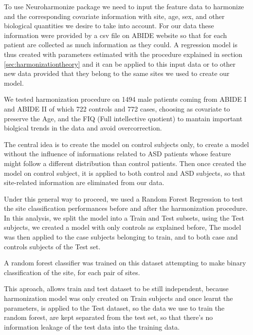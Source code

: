 \documentclass[10pt]{report}
\begin{document}
To use Neuroharmonize package we need to input the feature data to harmonize and the corresponding covariate information with site, age, sex, and other biological quantities we desire to take into account.
For our data these information were provided by a csv file on ABIDE website so that for each patient are collected as much information as they could.
A regression model is thus created with parameters estimated with the procedure explained in section \ref{sec:harmonizationtheory} and it can be applied to this input data or to other new data provided that they belong to the same sites we used to create our model.

We tested harmonization procedure on 1494 male patients coming from ABIDE I and ABIDE II of which 722 controls and 772 cases, choosing as covariate to preserve the Age, and the FIQ (Full intellective quotient) to mantain important biolgical trends in the data and avoid overcorrection.


The central idea is to create the model on control subjects only, to create a model without the influence of informations related to ASD patients whose feature might follow a different distribution than control patients.
Then once created the model on control subject, it is applied to both control and ASD subjects, so that site-related information are eliminated from our data.

Under this general way to proceed, we used a Random Forest Regression to test the site classification performances before and after the harmonization procedure.
In this analysis, we split the model into a Train and Test subsets, using the Test subjects, we created a model with only controls as explained before,
The model was then applied to the case subjects belonging to train, and to both case and controls subjects of the Test set.

A random forest classifier was trained on this dataset attempting to make binary classification of the site, for each pair of sites.

This aproach, allows train and test dataset to be still independent, because harmonization model was only created on Train subjects and once learnt the parameters, is applied to the Test dataset, so the data we use to train the random forest, are kept separated from the test set, so that there's no information leakage of the test data into the training data.
\newline
\end{document}
